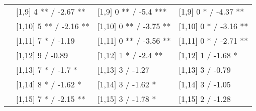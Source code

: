 \begin{table}
\begin{tabular}[t]{llll}
 & {}[1,9] 4 ** / -2.67 ** & {}[1,9] 0 ** / -5.4 *** & {}[1,9] 0 * / -4.37 **\\
 & {}[1,10] 5 ** / -2.16 ** & {}[1,10] 0 ** / -3.75 ** & {}[1,10] 0 * / -3.16 **\\
 & {}[1,11] 7 * / -1.19 & {}[1,11] 0 ** / -3.56 ** & {}[1,11] 0 * / -2.71 **\\
 & {}[1,12] 9  / -0.89 & {}[1,12] 1 * / -2.4 ** & {}[1,12] 1  / -1.68 *\\
\addlinespace
 & {}[1,13] 7 * / -1.7 * & {}[1,13] 3  / -1.27 & {}[1,13] 3  / -0.79\\
 & {}[1,14] 8 * / -1.62 * & {}[1,14] 3  / -1.62 * & {}[1,14] 3  / -1.05\\
 & {}[1,15] 7 * / -2.15 ** & {}[1,15] 3  / -1.78 * & {}[1,15] 2  / -1.28\\
\bottomrule
\end{tabular}
\end{table}
